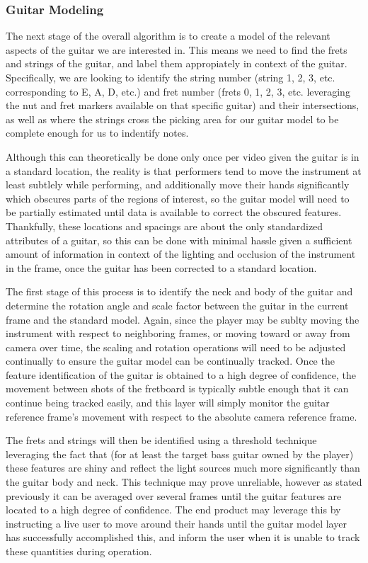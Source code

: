 \subsubsection{Guitar Modeling}
The next stage of the overall algorithm is to create a model of the relevant aspects of the guitar we are interested in.
This means we need to find the frets and strings of the guitar, and label them appropiately in context of the guitar.
Specifically, we are looking to identify the string number (string 1, 2, 3, etc. corresponding to E, A, D, etc.)
and fret number (frets 0, 1, 2, 3, etc. leveraging the nut and fret markers available on that specific guitar) and
their intersections, as well as where the strings cross the picking area for our guitar model to be complete enough
for us to indentify notes.
\par
Although this can theoretically be done only once per video given the guitar is in a standard location, 
the reality is that performers tend to move the instrument at least subtlely while performing,
and additionally move their hands significantly which obscures parts of the regions of interest,
so the guitar model will need to be partially estimated until data is available to correct the obscured features.
Thankfully, these locations and spacings are about the only standardized attributes of a guitar,
so this can be done with minimal hassle given a sufficient amount of information in context of the lighting
and occlusion of the instrument in the frame, once the guitar has been corrected to a standard location.
\par
The first stage of this process is to identify the neck and body of the guitar
and determine the rotation angle and scale factor between the guitar in the current frame and the standard model.
Again, since the player may be sublty moving the instrument with respect to neighboring frames,
or moving toward or away from camera over time, 
the scaling and rotation operations will need to be adjusted continually
to ensure the guitar model can be continually tracked.
Once the feature identification of the guitar is obtained to a high degree of confidence,
the movement between shots of the fretboard is typically subtle enough that it can continue being tracked easily,
and this layer will simply monitor the guitar reference frame's movement with respect to the absolute camera reference frame.
\par
The frets and strings will then be identified using a threshold technique leveraging the fact that
(for at least the target bass guitar owned by the player) these features are shiny and reflect
the light sources much more significantly than the guitar body and neck.
This technique may prove unreliable, however as stated previously it can be averaged over several
frames until the guitar features are located to a high degree of confidence.
The end product may leverage this by instructing a live user to move around their hands until
the guitar model layer has successfully accomplished this, and inform the user when it is unable
to track these quantities during operation.

